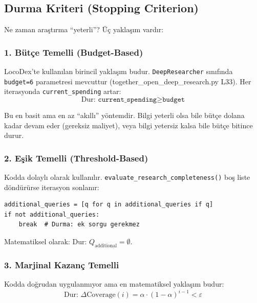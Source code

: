 \subsection{Durma Kriteri (Stopping Criterion)}

Ne zaman ara\c{s}t{\i}rma ``yeterli''? \"{U}\c{c} yakla\c{s}{\i}m vard{\i}r:

\subsubsection{1. B\"{u}t\c{c}e Temelli (Budget-Based)}

LocoDex'te kullan{\i}lan birincil yakla\c{s}{\i}m budur. \texttt{DeepResearcher} s{\i}n{\i}f{\i}nda \texttt{budget=6} parametresi mevcuttur (together\_open\_deep\_research.py L33). Her iterasyonda \texttt{current\_spending} artar:
\begin{equation}
\label{eq:budget_stop}
\text{Dur: } \texttt{current\_spending} \geq \texttt{budget}
\end{equation}

Bu en basit ama en az ``ak{\i}ll{\i}'' y\"{o}ntemdir. Bilgi yeterli olsa bile b\"{u}t\c{c}e dolana kadar devam eder (gereksiz maliyet), veya bilgi yetersiz kalsa bile b\"{u}t\c{c}e bitince durur.

\subsubsection{2. E\c{s}ik Temelli (Threshold-Based)}

Kodda dolayl{\i} olarak kullan{\i}l{\i}r. \texttt{evaluate\_research\_completeness()} bo\c{s} liste d\"{o}nd\"{u}r\"{u}rse iterasyon sonlan{\i}r:

\begin{lstlisting}[caption={E\c{s}ik temelli durma kriteri}, label=lst:threshold_stop]
additional_queries = [q for q in additional_queries if q]
if not additional_queries:
    break  # Durma: ek sorgu gerekmez
\end{lstlisting}

Matematiksel olarak: $\text{Dur: } Q_{\text{additional}} = \emptyset$.

\subsubsection{3. Marjinal Kazan\c{c} Temelli}

Kodda do\u{g}rudan uygulanm{\i}yor ama en matematiksel yakla\c{s}{\i}m budur:
\begin{equation}
\label{eq:marginal_stop}
\text{Dur: } \Delta\text{Coverage}(i) = \alpha \cdot (1-\alpha)^{i-1} < \varepsilon
\end{equation}


